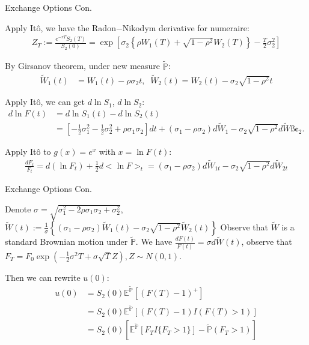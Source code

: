 \documentclass{beamer}
\begin{document}
\begin{frame}{Exchange Options Con.}

    {\footnotesize \footnotesize
    \par Apply Itô, we have the Radon$-$Nikodym derivative for numeraire:
    \begin{align*}
        Z_T := \frac{e^{-rT} S_2(T)}{S_2(0)} = \exp \left[ \sigma_2 
        \left\{ \rho W_1(T) + \sqrt{1 - \rho^2} W_2(T) \right\} - \frac{T}{2} \sigma_2^2 \right]
    \end{align*}
    \par By Girsanov theorem, under new measure $\tilde{\mathbb{P}}$:
    \begin{align*}
        \tilde{W}_1(t) &= W_1(t) - \rho\sigma_2 t, \;\; \tilde{W}_2(t) = W_2(t) - \sigma_2\sqrt{1-\rho^2} t
    \end{align*}
    \par Apply Itô, we can get $d\ln S_1$, $d\ln S_2$:
    \begin{align*}
        d \ln F(t) &= d \ln S_1(t) - d \ln S_2(t) \\
        &= \left[  - \tfrac{1}{2}\sigma_1^2  - \tfrac{1}{2}\sigma_2^2 + \rho \sigma_1 \sigma_2 \right] dt 
        + (\sigma_1 - \rho \sigma_2) d\tilde{W}_1 - \sigma_2 \sqrt{1-\rho^2} d\tilde{W}ß¢_2.
    \end{align*}
    \par Apply Itô to $g(x) = e^x$ with $x = \ln F(t)$:
    \begin{align*}
        \frac{dF_t}{F_t} = d(\ln F_t) + \frac{1}{2} d<\ln F>_t 
        = (\sigma_1 - \rho\sigma_2) d\tilde{W}_{1t} - \sigma_2 \sqrt{1 - \rho^2} d\tilde{W}_{2t}
    \end{align*}
    }
\end{frame}
\begin{frame}{Exchange Options Con.}
    
    {\footnotesize \footnotesize
    \par Denote $\sigma  = \sqrt{\sigma_1^2 - 2\rho\sigma_1\sigma_2 + \sigma_2^2}$, $\tilde{W}(t) := \frac{1}{\sigma} \left\{ (\sigma_1 - \rho\sigma_2)\tilde{W}_1(t) - \sigma_2\sqrt{1 - \rho^2}\tilde{W}_2(t) \right\}$
    Observe that $\tilde{W}$ is a standard Brownian motion under $\tilde{\mathbb{P}}$. 
    We have $\frac{dF(t)}{F(t)} = \sigma d\tilde{W}(t)$, observe that $F_T = F_0 \exp \left( - \frac{1}{2} \sigma^2 T 
    + \sigma \sqrt{T} Z \right),  Z \sim N(0, 1)$.
     \par Then we can rewrite $u(0)$:
     \begin{align*}
        u(0) &= S_2(0) \mathbb{E}^{\tilde{\mathbb{P}}} \left[ (F(T) - 1)^+ \right]\\
        &= S_2(0) \mathbb{E}^{\tilde{\mathbb{P}}} \left[ (F(T) - 1)I(F(T)>1) \right]\\
        &=S_2(0) \left[ \mathbb{E}^{\tilde{\mathbb{P}}}[F_T I{\{F_T > 1\}}] - \tilde{\mathbb{P}}(F_T > 1)\right] \\
     \end{align*}
    }

\end{frame}

\end{document}
